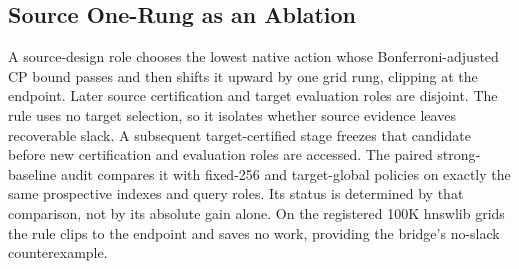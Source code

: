 \subsection{Source One-Rung as an Ablation}
\label{sec:slack-method}
A source-design role chooses the lowest native action whose Bonferroni-adjusted CP bound passes and then shifts it upward by one grid rung, clipping at the endpoint. Later source certification and target evaluation roles are disjoint. The rule uses no target selection, so it isolates whether source evidence leaves recoverable slack. A subsequent target-certified stage freezes that candidate before new certification and evaluation roles are accessed. The paired strong-baseline audit compares it with fixed-256 and target-global policies on exactly the same prospective indexes and query roles. Its status is determined by that comparison, not by its absolute gain alone. On the registered 100K hnswlib grids the rule clips to the endpoint and saves no work, providing the bridge's no-slack counterexample.
